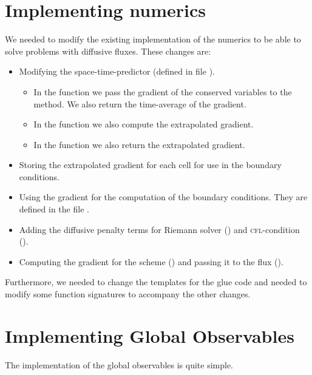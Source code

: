 \section{Implementing numerics}
We needed to modify the existing implementation of the numerics to be able to solve problems with diffusive fluxes.
These changes are:
\begin{itemize}
\item Modifying the space-time-predictor (defined in file ).
  \begin{itemize}
  \item In the function  we pass the gradient of the conserved variables to the  method.
    We also return the time-average of the gradient.
   \item In the function  we also compute the extrapolated gradient.
    \item In the function  we also return the extrapolated gradient.
  \end{itemize}
\item Storing the extrapolated gradient for each cell for use in the boundary conditions.
\item Using the gradient for the computation of the boundary conditions.
  They are defined in the file .
\item Adding the diffusive penalty terms for Riemann solver () and \textsc{cfl}-condition ().
\item Computing the gradient for the \muscl{} scheme () and passing it to the flux ().
\end{itemize}
Furthermore, we needed to change the templates for the glue code and needed to modify some function signatures to accompany the other changes.

\section{Implementing Global Observables}
\newcommand{\ngobs}{N^{\text{gobs}}}
The implementation of the global observables is quite simple.

